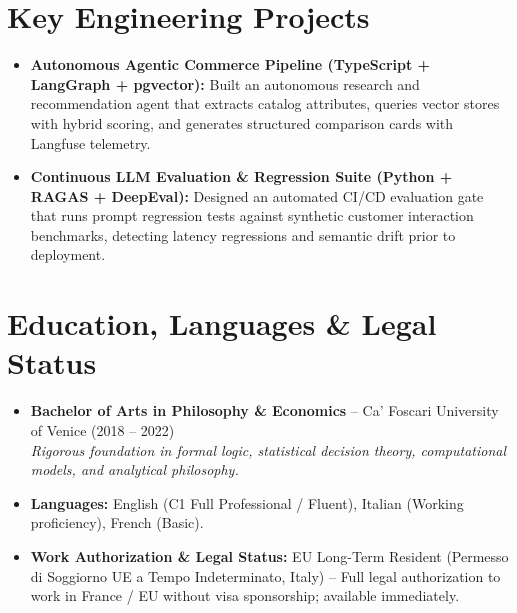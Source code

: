 \documentclass[a4paper,10pt]{article}
\begin{document}
\section{Key Engineering Projects}
\begin{itemize}
  \item \textbf{Autonomous Agentic Commerce Pipeline (TypeScript + LangGraph + pgvector):} Built an autonomous research and recommendation agent that extracts catalog attributes, queries vector stores with hybrid scoring, and generates structured comparison cards with Langfuse telemetry.
  \item \textbf{Continuous LLM Evaluation \& Regression Suite (Python + RAGAS + DeepEval):} Designed an automated CI/CD evaluation gate that runs prompt regression tests against synthetic customer interaction benchmarks, detecting latency regressions and semantic drift prior to deployment.
\end{itemize}

\section{Education, Languages \& Legal Status}
\begin{itemize}
  \item \textbf{Bachelor of Arts in Philosophy \& Economics} -- Ca' Foscari University of Venice (2018 -- 2022) \\
  \textit{Rigorous foundation in formal logic, statistical decision theory, computational models, and analytical philosophy.}
  \item \textbf{Languages:} English (C1 Full Professional / Fluent), Italian (Working proficiency), French (Basic).
  \item \textbf{Work Authorization \& Legal Status:} EU Long-Term Resident (Permesso di Soggiorno UE a Tempo Indeterminato, Italy) -- Full legal authorization to work in France / EU without visa sponsorship; available immediately.
\end{itemize}
\end{document}

